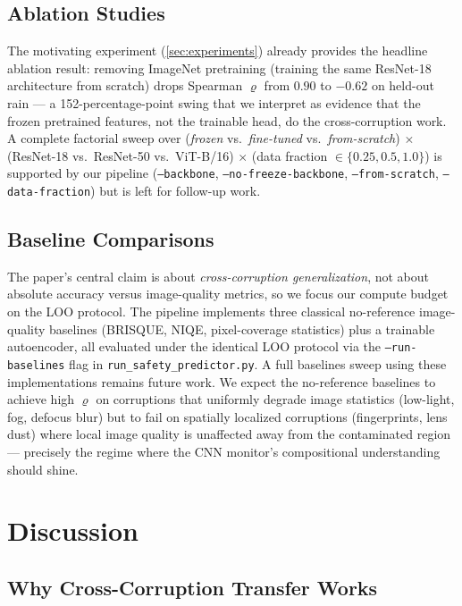 \documentclass[letterpaper]{IEEEtran}
\renewcommand{\rho}{\varrho}
\begin{document}
\subsection{Ablation Studies}

The motivating experiment (\cref{sec:experiments}) already provides the headline ablation result: removing ImageNet pretraining (training the same ResNet-18 architecture from scratch) drops Spearman $\rho$ from $0.90$ to $-0.62$ on held-out rain --- a 152-percentage-point swing that we interpret as evidence that the frozen pretrained features, not the trainable head, do the cross-corruption work.
A complete factorial sweep over (\textit{frozen} vs.\ \textit{fine-tuned} vs.\ \textit{from-scratch}) $\times$ (ResNet-18 vs.\ ResNet-50 vs.\ ViT-B/16) $\times$ (data fraction $\in \{0.25, 0.5, 1.0\}$) is supported by our pipeline (\texttt{--backbone}, \texttt{--no-freeze-backbone}, \texttt{--from-scratch}, \texttt{--data-fraction}) but is left for follow-up work.

\subsection{Baseline Comparisons}

The paper's central claim is about \emph{cross-corruption generalization}, not about absolute accuracy versus image-quality metrics, so we focus our compute budget on the LOO protocol.
The pipeline implements three classical no-reference image-quality baselines (BRISQUE, NIQE, pixel-coverage statistics) plus a trainable autoencoder, all evaluated under the identical LOO protocol via the \texttt{--run-baselines} flag in \texttt{run\_safety\_predictor.py}.
A full baselines sweep using these implementations remains future work.
We expect the no-reference baselines to achieve high $\rho$ on corruptions that uniformly degrade image statistics (low-light, fog, defocus blur) but to fail on spatially localized corruptions (fingerprints, lens dust) where local image quality is unaffected away from the contaminated region --- precisely the regime where the CNN monitor's compositional understanding should shine.

\section{Discussion}
\label{sec:discussion}

\subsection{Why Cross-Corruption Transfer Works}
\end{document}
